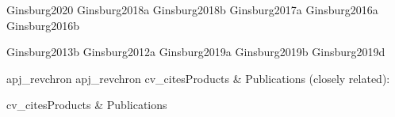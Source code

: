 \documentclass[12pt]{article}
\begin{document}

%


%

\nocite{biba}{Ginsburg2020}
\nocite{biba}{Ginsburg2018a}
\nocite{biba}{Ginsburg2018b}
\nocite{biba}{Ginsburg2017a}
\nocite{biba}{Ginsburg2016a}
\nocite{biba}{Ginsburg2016b}

\nocite{bibb}{Ginsburg2013b}
\nocite{bibb}{Ginsburg2012a}
\nocite{bibb}{Ginsburg2019a}
\nocite{bibb}{Ginsburg2019b}
\nocite{bibb}{Ginsburg2019d}

{apj_revchron}
{apj_revchron}
%
%
{cv_cites}{Products \& Publications (closely related):}
%


{cv_cites}{Products \& Publications}

\vfill  
\nopagebreak



%


% 
% 
% 
% 
% 
% 
% 
% 
% 
% 
% 
% 
% 
% 
% 
\end{document}
